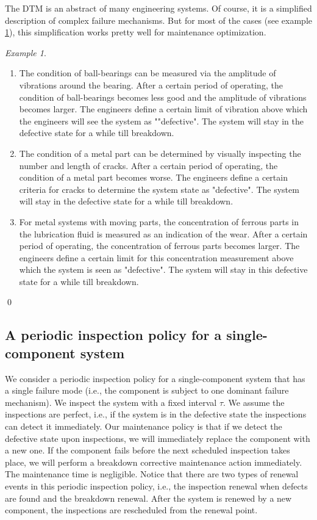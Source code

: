 \documentclass[10pt,a4paper]{article}
\theoremstyle{remark}
\newtheorem{example}{Example}
\begin{document}
The DTM is an abstract of many engineering systems. Of course, it is a simplified description of complex failure mechanisms. But for most of the cases (see example \ref{ex:DTM}), this simplification works pretty well for maintenance optimization.
\begin{example} \label{ex:DTM} \renewcommand{\qedsymbol}{$\lozenge$} \mbox{}
\begin{enumerate}
\item The condition of ball-bearings can be measured via the amplitude of vibrations around the bearing. After a certain period of operating, the condition of ball-bearings becomes less good and the amplitude of vibrations becomes larger. The engineers define a certain limit of vibration above which the engineers will see the system as ""defective". The system will stay in the defective state for a while till breakdown.
\item The condition of a metal part can be determined by visually inspecting the number and length of cracks. After a certain period of operating, the condition of a metal part becomes worse. The engineers define a certain criteria for cracks to determine the system state as "defective". The system will stay in the defective state for a while till breakdown.
\item For metal systems with moving parts, the concentration of ferrous parts in the lubrication fluid is measured as an indication of the wear. After a certain period of operating, the concentration of ferrous parts becomes larger. The engineers define a certain limit for this concentration measurement above which the system is seen as "defective". The system will stay in this defective state for a while till breakdown.
\end{enumerate}
\qed
\end{example}

\subsection{A periodic inspection policy for a single-component system} \label{sec:DTMmodel1} 
We consider a periodic inspection policy for a single-component system that has a single failure mode (i.e., the component is subject to one dominant failure mechanism). We inspect the system with a fixed interval $\tau$. We assume the inspections are perfect, i.e., if the system is in the defective state the inspections can detect it immediately. Our maintenance policy is that if we detect the defective state upon inspections, we will immediately replace the component with a new one. If the component fails before the next scheduled inspection takes place, we will perform a breakdown corrective maintenance action immediately. The maintenance time is negligible. Notice that there are two types of renewal events in this periodic inspection policy, i.e., the inspection renewal when defects are found and the breakdown renewal. After the system is renewed by a new component, the inspections are rescheduled from the renewal point.
\end{document}

